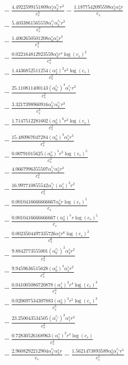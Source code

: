 \documentclass[10pt]{article}
\begin{document}
\begin{align*}
&{}  - \frac{4.4922599151809 \alpha_{1}^s \alpha_{2}^{c_s} r^{3}}{c_{s}^{3}} - \frac{1.1877542095598 \alpha_{2}^s \alpha_{3}^s r}{c_{s}} \\
&{}  - \frac{5.4033861565559 \alpha_{1}^{c_s} \alpha_{2}^{c_s} r^{3}}{c_{s}^{3}} \\
&{}  - \frac{1.4062650501208 \alpha_{0}^s \alpha_{3}^s r^{3}}{c_{s}^{3}} \\
&{}  - \frac{0.022164812923559 \alpha_{3}^s r^{4} \log{\left(c_{s} \right)}^{2}}{c_{s}^{4}} \\
&{}  - \frac{1.4436852511254 \left(\alpha_{2}^s\right)^{2} r^{2} \log{\left(c_{s} \right)}}{c_{s}^{2}} \\
&{}  - \frac{25.110811400143 \left(\alpha_{0}^{c_s}\right)^{4} \alpha_{1}^{c_s} r^{2}}{c_{s}^{2}} \\
&{}  - \frac{3.3217398960916 \alpha_{0}^{c_s} \alpha_{3}^{c_s} r^{3}}{c_{s}^{3}} \\
&{}  - \frac{1.7147512281602 \left(\alpha_{0}^s\right)^{6} r^{2} \log{\left(c_{s} \right)}}{c_{s}^{2}} \\
&{}  - \frac{15.480967047284 \left(\alpha_{0}^s\right)^{3} \alpha_{1}^s r^{3}}{c_{s}^{3}} \\
&{}  - \frac{0.00791015625 \left(\alpha_{0}^s\right)^{5} r^{3} \log{\left(c_{s} \right)}^{5}}{c_{s}^{3}} \\
&{}  - \frac{4.0667996355507 \alpha_{1}^{c_s} \alpha_{2}^s r^{3}}{c_{s}^{3}} \\
&{}  - \frac{16.997710855542 \alpha_{1}^{c_s} \left(\alpha_{1}^s\right)^{2} r^{2}}{c_{s}^{2}} \\
&{}  - \frac{0.0010416666666667 \alpha_{6}^s r \log{\left(c_{s} \right)}^{5}}{c_{s}} \\
&{}  - \frac{0.0010416666666667 \left(\alpha_{0}^s\right)^{7} r \log{\left(c_{s} \right)}^{5}}{c_{s}} \\
&{}  - \frac{0.0023504497335726 \alpha_{1}^s r^{6} \log{\left(c_{s} \right)}^{2}}{c_{s}^{6}} \\
&{}  - \frac{9.8842773555001 \left(\alpha_{0}^{c_s}\right)^{2} \alpha_{3}^s r^{2}}{c_{s}^{2}} \\
&{}  - \frac{9.9459636515628 \left(\alpha_{0}^s\right)^{4} \alpha_{1}^s r^{2}}{c_{s}^{2}} \\
&{}  - \frac{0.041005086720878 \left(\alpha_{1}^s\right)^{2} r^{4} \log{\left(c_{s} \right)}^{3}}{c_{s}^{4}} \\
&{}  - \frac{0.020697534307883 \left(\alpha_{0}^s\right)^{3} r^{5} \log{\left(c_{s} \right)}^{3}}{c_{s}^{5}} \\
&{}  - \frac{23.250043534505 \left(\alpha_{1}^{c_s}\right)^{2} \alpha_{1}^s r^{2}}{c_{s}^{2}} \\
&{}  - \frac{0.72830526168963 \left(\alpha_{1}^s\right)^{2} r^{4} \log{\left(c_{s} \right)}}{c_{s}^{4}} \\
&{}  - \frac{2.9608292212904 \alpha_{2}^{c_s} \alpha_{3}^s r}{c_{s}} - \frac{1.5621473893589 \alpha_{0}^s \alpha_{1}^{c_s} r^{5}}{c_{s}^{5}}
\end{align*}
\end{document}
